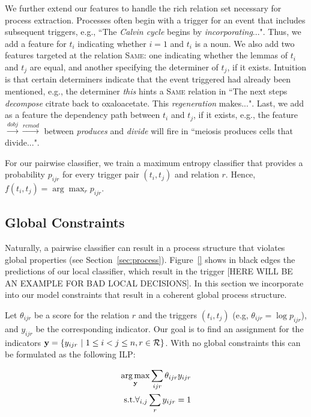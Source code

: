 We further extend our features to handle the rich relation set necessary for process extraction. Processes often begin with a trigger for an event that includes subsequent triggers, e.g., ``The \emph{Calvin cycle} begins by \emph{incorporating}...". Thus, we add a feature for $t_i$ indicating whether $i=1$ and $t_i$  is a noun. We also add two features targeted at the relation \textsc{Same}: one indicating whether the lemmas of $t_i$ and $t_j$ are equal, and another specifying the determiner of $t_j$, if it exists. Intuition is that certain determiners indicate that the event triggered had already been mentioned, e.g., the determiner \emph{this} hints a \textsc{Same} relation in ``The next steps \emph{decompose} citrate back to oxaloacetate. This \emph{regeneration} makes...". Last, we add as a feature the dependency path between $t_i$ and $t_j$, if it exists, e.g., the feature $\xrightarrow{\scriptscriptstyle dobj} \xrightarrow{\scriptscriptstyle rcmod}$ between \emph{produces} and \emph{divide} will fire in ``meiosis produces cells that divide...".

For our pairwise classifier, we train a maximum entropy classifier that provides a probability $p_{ijr}$ for every trigger pair $(t_i,t_j)$ and relation $r$. Hence, $f(t_i,t_j)= \arg\max_r p_{ijr}$.

\subsection{Global Constraints} \label{subsec:global}

Naturally, a pairwise classifier can result in a process structure that violates global properties (see Section~\ref{sec:process}). Figure~\ref{} shows in black edges the predictions of our local classifier, which result in the trigger [HERE WILL BE AN EXAMPLE FOR BAD LOCAL DECISIONS]. In this section we incorporate into our model constraints that result in a coherent global process structure.

Let $\theta_{ijr}$ be a score for the relation $r$ and the triggers $(t_i,t_j)$ (e.g, $\theta_{ijr}=\log p_{ijr}$), and $y_{ijr}$ be the corresponding indicator. Our goal is to find an assignment for the indicators $\mathbf{y}=\{y_{ijr} \ | \ 1 \leq i < j \leq n, r \in \mathcal{R} \}$. With no global constraints this can be formulated as the following ILP:

\begin{align}
\operatorname*{arg\,max}_{\mathbf{y}} \sum_{ijr} \theta_{ijr} y_{ijr} \\
\mbox{s.t.} \forall_{i,j} \sum_r y_{ijr}=1 \nonumber
\end{align}

